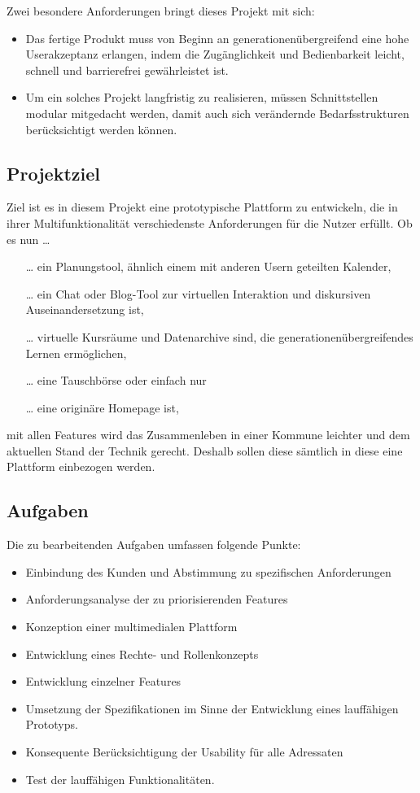 Zwei besondere Anforderungen bringt dieses Projekt mit sich:
\begin{itemize}
  \item Das fertige Produkt muss von Beginn an generationenübergreifend eine hohe Userakzeptanz
  erlangen, indem die Zugänglichkeit und Bedienbarkeit leicht, schnell und barrierefrei
  gewährleistet ist.
  \item Um ein solches Projekt langfristig zu realisieren, müssen Schnittstellen modular mitgedacht werden, damit auch sich verändernde Bedarfsstrukturen berücksichtigt werden können.
\end{itemize}

\subsection{Projektziel}
\label{sub:project-goal}

Ziel ist es in diesem Projekt eine prototypische Plattform zu entwickeln, die in ihrer
Multifunktionalität verschiedenste Anforderungen für die Nutzer erfüllt. Ob es nun …

\begin{itemize}
  \item[\dots] ein Planungstool, ähnlich einem mit anderen Usern geteilten Kalender,
  \item[\dots] ein Chat oder Blog-Tool zur virtuellen Interaktion und diskursiven Auseinandersetzung ist,
  \item[\dots] virtuelle Kursräume und Datenarchive sind, die generationenübergreifendes Lernen ermöglichen,
  \item[\dots] eine Tauschbörse oder einfach nur
  \item[\dots] eine originäre Homepage ist,

\end{itemize}
mit allen Features wird das Zusammenleben in einer Kommune leichter und dem
aktuellen Stand der Technik gerecht. Deshalb sollen diese sämtlich in diese eine Plattform
einbezogen werden.

\subsection{Aufgaben}
\label{sub:project-tasks}
Die zu bearbeitenden Aufgaben umfassen folgende Punkte:
\begin{itemize}
  \item Einbindung des Kunden und Abstimmung zu spezifischen Anforderungen
  \item Anforderungsanalyse der zu priorisierenden Features
  \item Konzeption einer multimedialen Plattform
  \item Entwicklung eines Rechte- und Rollenkonzepts
  \item Entwicklung einzelner Features
  \item Umsetzung der Spezifikationen im Sinne der Entwicklung eines lauffähigen Prototyps.
  \item Konsequente Berücksichtigung der Usability für alle Adressaten
  \item Test der lauffähigen Funktionalitäten.
\end{itemize}


